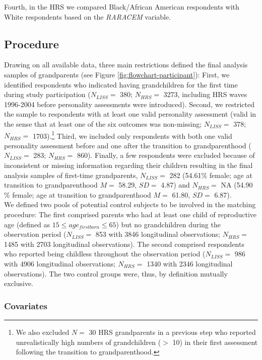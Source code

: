 \documentclass[
  english,
  man,floatsintext]{apa7}
\begin{document}
Fourth, in the HRS we compared Black/African American respondents with White respondents based on the \emph{RARACEM} variable.

\hypertarget{procedure}{%
\subsection{Procedure}\label{procedure}}

Drawing on all available data, three main restrictions defined the final analysis samples of grandparents (see Figure \ref{fig:flowchart-participant}): First, we identified respondents who indicated having grandchildren for the first time during study participation (\(N_{LISS} =\) 380; \(N_{HRS} =\) 3273, including HRS waves 1996-2004 before personality assessments were introduced). Second, we restricted the sample to respondents with at least one valid personality assessment (valid in the sense that at least one of the six outcomes was non-missing; \(N_{LISS} =\) 378; \(N_{HRS} =\) 1703).\footnote{We also excluded \(N =\) 30 HRS grandparents in a previous step who reported unrealistically high numbers of grandchildren (\(>\) 10) in their first assessment following the transition to grandparenthood.} Third, we included only respondents with both one valid personality assessment before and one after the transition to grandparenthood (\(N_{LISS} =\) 283; \(N_{HRS} =\) 860). Finally, a few respondents were excluded because of inconsistent or missing information regarding their children resulting in the final analysis samples of first-time grandparents, \(N_{LISS} =\) 282 (54.61\(\%\) female; age at transition to grandparenthood \(M =\) 58.29, \(SD =\) 4.87) and \(N_{HRS} =\) NA (54.90\(\%\) female; age at transition to grandparenthood \(M =\) 61.80, \(SD =\) 6.87).\\
We defined two pools of potential control subjects to be involved in the matching procedure: The first comprised parents who had at least one child of reproductive age (defined as \(15 \leq age_{firstborn}\leq65\)) but no grandchildren during the observation period (\(N_{LISS} =\) 853 with 3846 longitudinal observations; \(N_{HRS} =\) 1485 with 2703 longitudinal observations). The second comprised respondents who reported being childless throughout the observation period (\(N_{LISS} =\) 986 with 4906 longitudinal observations; \(N_{HRS} =\) 1340 with 2346 longitudinal observations). The two control groups were, thus, by definition mutually exclusive.

\hypertarget{covariates}{%
\subsubsection{Covariates}\label{covariates}}
\end{document}
